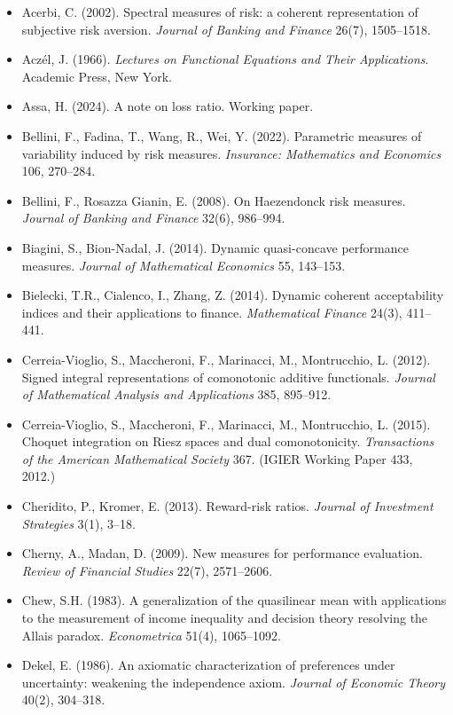 \begin{itemize}
\item Acerbi, C. (2002). Spectral measures of risk: a coherent representation of subjective risk aversion. \emph{Journal of Banking and Finance} 26(7), 1505--1518.
\item Acz\'el, J. (1966). \emph{Lectures on Functional Equations and Their Applications}. Academic Press, New York.
\item Assa, H. (2024). A note on loss ratio. Working paper.
\item Bellini, F., Fadina, T., Wang, R., Wei, Y. (2022). Parametric measures of variability induced by risk measures. \emph{Insurance: Mathematics and Economics} 106, 270--284.
\item Bellini, F., Rosazza Gianin, E. (2008). On Haezendonck risk measures. \emph{Journal of Banking and Finance} 32(6), 986--994.
\item Biagini, S., Bion-Nadal, J. (2014). Dynamic quasi-concave performance measures. \emph{Journal of Mathematical Economics} 55, 143--153.
\item Bielecki, T.R., Cialenco, I., Zhang, Z. (2014). Dynamic coherent acceptability indices and their applications to finance. \emph{Mathematical Finance} 24(3), 411--441.
\item Cerreia-Vioglio, S., Maccheroni, F., Marinacci, M., Montrucchio, L. (2012). Signed integral representations of comonotonic additive functionals. \emph{Journal of Mathematical Analysis and Applications} 385, 895--912.
\item Cerreia-Vioglio, S., Maccheroni, F., Marinacci, M., Montrucchio, L. (2015). Choquet integration on Riesz spaces and dual comonotonicity. \emph{Transactions of the American Mathematical Society} 367. (IGIER Working Paper 433, 2012.)
\item Cheridito, P., Kromer, E. (2013). Reward-risk ratios. \emph{Journal of Investment Strategies} 3(1), 3--18.
\item Cherny, A., Madan, D. (2009). New measures for performance evaluation. \emph{Review of Financial Studies} 22(7), 2571--2606.
\item Chew, S.H. (1983). A generalization of the quasilinear mean with applications to the measurement of income inequality and decision theory resolving the Allais paradox. \emph{Econometrica} 51(4), 1065--1092.
\item Dekel, E. (1986). An axiomatic characterization of preferences under uncertainty: weakening the independence axiom. \emph{Journal of Economic Theory} 40(2), 304--318.

\end{itemize}
